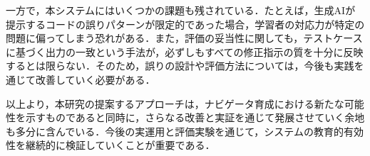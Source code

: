 \documentclass[twoside,twocolumn,10pt]{jsarticle}
\begin{document}
一方で，本システムにはいくつかの課題も残されている．たとえば，生成AIが提示するコードの誤りパターンが限定的であった場合，学習者の対応力が特定の問題に偏ってしまう恐れがある．また，評価の妥当性に関しても，テストケースに基づく出力の一致という手法が，必ずしもすべての修正指示の質を十分に反映するとは限らない．そのため，誤りの設計や評価方法については，今後も実践を通じて改善していく必要がある．

以上より，本研究の提案するアプローチは，ナビゲータ育成における新たな可能性を示すものであると同時に，さらなる改善と実証を通じて発展させていく余地も多分に含んでいる．今後の実運用と評価実験を通じて，システムの教育的有効性を継続的に検証していくことが重要である．

\end{document}
